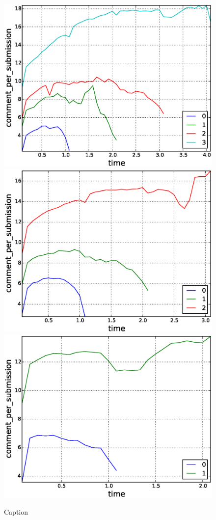 \begin{figure}[!tb]
\includegraphics[scale=0.2]{./images/comments_per_submissions_for_surviving_year_for_2011.eps}
\includegraphics[scale=0.2]{./images/comments_per_submissions_for_surviving_year_for_2012.eps}
\includegraphics[scale=0.2]{./images/comments_per_submissions_for_surviving_year_for_2013.eps}
\caption{Caption}
\label{fig:comments_per_submissions_for_surviving_year}
\end{figure}

